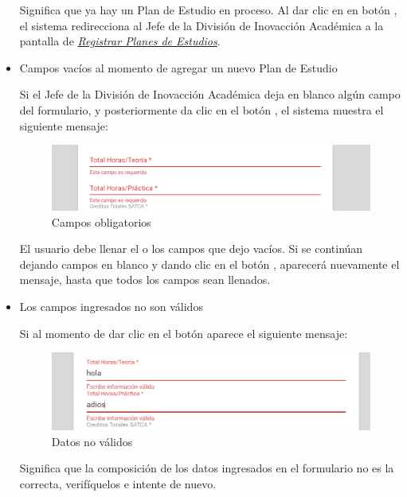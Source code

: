 \begin{itemize}
	Significa que ya hay un Plan de Estudio en proceso. Al dar clic en en botón , el sistema redirecciona al Jefe de la División de Inovacción Académica a la pantalla de \hyperlink{registrarPE}{\textit{Registrar Planes de Estudios}}.

	\item Campos vacíos al momento de agregar un nuevo Plan de Estudio

	Si el Jefe de la División de Inovacción Académica deja en blanco algún campo del formulario, y posteriormente da clic en el botón , el sistema muestra el siguiente mensaje:
		\begin{figure}[H]
		\centering
		\hypertarget{ms4}{\includegraphics[width=0.7\linewidth]{images/SP4-GPE/m4}}
		\caption{Campos obligatorios}
		\label{ms4}
	    \end{figure}

	El usuario debe llenar el o los campos que dejo vacíos. Si se continúan dejando campos en blanco y dando clic en el botón , aparecerá nuevamente el mensaje, hasta que todos los campos sean llenados.\\

	\newpage

	\item Los campos ingresados no son válidos

	Si al momento de dar clic en el botón  aparece el siguiente mensaje:
	\begin{figure}[H]
		\centering
		\hypertarget{ms5}{\includegraphics[width=0.7\linewidth]{images/SP4-GPE/m5}}
		\caption{Datos no válidos}
		\label{ms5}
	\end{figure}

	Significa que la composición de los datos ingresados en el formulario no es la correcta, verifíquelos e intente de nuevo.

\end{itemize}
